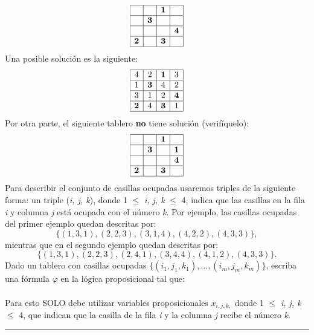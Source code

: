 \documentclass[12pt]{article}
\begin{document}
\[
\begin{array}{|c|c|c|c|} \hline
 &  & \textbf{1} &  \\ \hline
 & \textbf{3} &  &  \\ \hline
 &  &  & \textbf{4} \\ \hline
\textbf{2} &  & \textbf{3} &  \\ \hline
\end{array}
\]
Una posible solución es la siguiente:
\[
\begin{array}{|c|c|c|c|} \hline
4 & 2 & \textbf{1} & 3 \\ \hline
1 & \textbf{3} & 4 & 2 \\ \hline
3 & 1 & 2 & \textbf{4} \\ \hline
\textbf{2} & 4 & \textbf{3} & 1 \\ \hline
\end{array}
\]
Por otra parte, el siguiente tablero \textbf{no} tiene solución (verifíquelo):
\[
\begin{array}{|c|c|c|c|} \hline
 &  & \textbf{1} &  \\ \hline
 & \textbf{3} &  & \textbf{1} \\ \hline
 &  &  & \textbf{4} \\ \hline
\textbf{2} &  & \textbf{3} &  \\ \hline
\end{array}
\]
Para describir el conjunto de casillas ocupadas usaremos triples de la siguiente forma: un triple
(\textit{i, j, k}), donde 1 $\leq$ \textit{i, j, k} $\leq$ 4, indica que las casillas en la fila \textit{i}
y columna \textit{j} está ocupada con el número \textit{k}. Por ejemplo, las casillas ocupadas del primer
ejemplo quedan descritas por:
\[\{(1, 3, 1), (2, 2, 3), (3, 1, 4), (4, 2, 2), (4, 3, 3)\},\]
mientras que en el segundo ejemplo quedan descritas por:
\[\{(1, 3, 1), (2, 2, 3), (2, 4, 1), (3, 4, 4), (4, 1, 2), (4, 3, 3)\}.\]
Dado un tablero con casillas ocupadas $\{(i_1, j_1, k_1),..., (i_m, j_m, k_m)\}$, escriba una fórmula
$\varphi$ en la lógica proposicional tal que:\\
\\
Para esto SOLO debe utilizar variables proposicionales $x_{i,j,k,}$ donde 1 $\leq$ \textit{i, j, k} $\leq$ 4, que
indican que la casilla de la fila \textit{i} y la columna \textit{j} recibe el número \textit{k}.

\rule{\linewidth}{0.4pt} %
\end{document}
